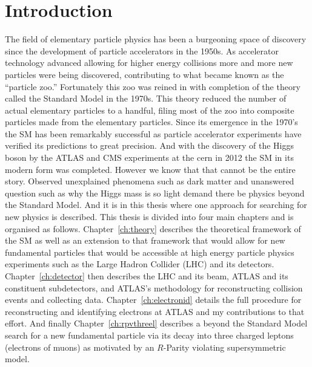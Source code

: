\chapter[Introduction][Introduction]{Introduction}
The field of elementary particle physics has been a burgeoning space of discovery since the development of particle accelerators in the 1950s.
As accelerator technology advanced allowing for higher energy collisions more and more new particles were being discovered, contributing to what became known as the ``particle zoo.''
Fortunately this zoo was reined in with completion of the theory called the Standard Model in the 1970s.
This theory reduced the number of actual elementary particles to a handful, filing most of the zoo into composite particles made from the elementary particles. 
Since its emergence in the 1970's the SM has been remarkably successful as particle accelerator experiments have verified its predictions to great precision.
And with the discovery of the Higgs boson by the ATLAS and CMS experiments at the \gls{cern} in 2012 the SM in its modern form was completed.
However we know that that cannot be the entire story.
Observed unexplained phenomena such as dark matter and unanswered question such as why the Higgs mass is so light demand there be physics beyond the Standard Model.
And it is in this thesis where one approach for searching for new physics is described.
This thesis is divided into four main chapters and is organised as follows. 
Chapter~\ref{ch:theory} describes the theoretical framework of the SM as well as an extension to that framework that would allow for new fundamental particles that would be accessible at high energy particle physics experiments such as the Large Hadron Collider (LHC) and its detectors.
Chapter~\ref{ch:detector} then describes the LHC and its beam, ATLAS and its constituent subdetectors, and ATLAS's methodology for reconstructing collision events and collecting data.
Chapter~\ref{ch:electronid} details the full procedure for reconstructing and identifying electrons at ATLAS and my contributions to that effort.
And finally Chapter~\ref{ch:rpvthreel} describes a beyond the Standard Model search for a new fundamental particle via its decay into three charged leptons (electrons of muons) as motivated by an $R$-Parity violating supersymmetric model.



